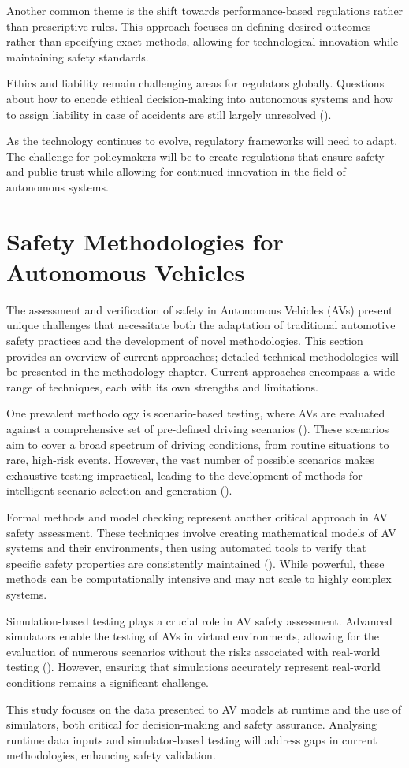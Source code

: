 Another common theme is the shift towards performance-based regulations rather than prescriptive rules. This approach focuses on defining desired outcomes rather than specifying exact methods, allowing for technological innovation while maintaining safety standards.

Ethics and liability remain challenging areas for regulators globally. Questions about how to encode ethical decision-making into autonomous systems and how to assign liability in case of accidents are still largely unresolved (\cite{Awad2018}).

As the technology continues to evolve, regulatory frameworks will need to adapt. The challenge for policymakers will be to create regulations that ensure safety and public trust while allowing for continued innovation in the field of autonomous systems.

\section{Safety Methodologies for Autonomous Vehicles}

The assessment and verification of safety in Autonomous Vehicles (AVs) present unique challenges that necessitate both the adaptation of traditional automotive safety practices and the development of novel methodologies. This section provides an overview of current approaches; detailed technical methodologies will be presented in the methodology chapter. Current approaches encompass a wide range of techniques, each with its own strengths and limitations.

One prevalent methodology is scenario-based testing, where AVs are evaluated against a comprehensive set of pre-defined driving scenarios (\cite{Feng2021}). These scenarios aim to cover a broad spectrum of driving conditions, from routine situations to rare, high-risk events. However, the vast number of possible scenarios makes exhaustive testing impractical, leading to the development of methods for intelligent scenario selection and generation (\cite{Koren2018}).

Formal methods and model checking represent another critical approach in AV safety assessment. These techniques involve creating mathematical models of AV systems and their environments, then using automated tools to verify that specific safety properties are consistently maintained (\cite{Luckcuck2019}). While powerful, these methods can be computationally intensive and may not scale to highly complex systems.

Simulation-based testing plays a crucial role in AV safety assessment. Advanced simulators enable the testing of AVs in virtual environments, allowing for the evaluation of numerous scenarios without the risks associated with real-world testing (\cite{Dosovitskiy2017}). However, ensuring that simulations accurately represent real-world conditions remains a significant challenge.

This study focuses on the data presented to AV models at runtime and the use of simulators, both critical for decision-making and safety assurance. Analysing runtime data inputs and simulator-based testing will address gaps in current methodologies, enhancing safety validation.

